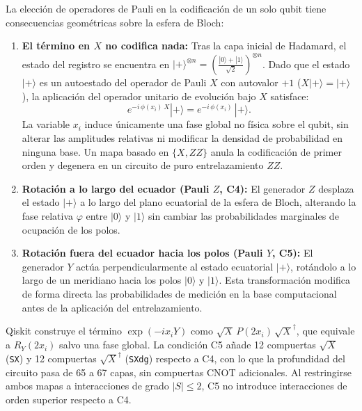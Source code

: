La elección de operadores de Pauli en la codificación de un solo qubit tiene consecuencias
geométricas sobre la esfera de Bloch:
\begin{enumerate}
  \item \textbf{El término en $X$ no codifica nada:} Tras la capa inicial de Hadamard,
        el estado del registro se encuentra en $|+\rangle^{\otimes n} = \left(\frac{|0\rangle + |1\rangle}{\sqrt{2}}\right)^{\otimes n}$.
        Dado que el estado $|+\rangle$ es un autoestado del operador de Pauli $X$ con
        autovalor $+1$ ($X|+\rangle = |+\rangle$), la aplicación del operador unitario de
        evolución bajo $X$ satisface:
        \begin{equation}
          e^{-i\,\phi(x_i)\,X}|+\rangle = e^{-i\,\phi(x_i)}\,|+\rangle.
          \label{eq:x_eigenstate_phase}
        \end{equation}
        La variable $x_i$ induce únicamente una fase global no física sobre el qubit, sin
        alterar las amplitudes relativas ni modificar la densidad de probabilidad en
        ninguna base. Un mapa basado en $\{X, ZZ\}$ anula la codificación
        de primer orden y degenera en un circuito de puro entrelazamiento $ZZ$.
  \item \textbf{Rotación a lo largo del ecuador (Pauli $Z$, C4):} El generador $Z$ desplaza
        el estado $|+\rangle$ a lo largo del plano ecuatorial de la esfera de Bloch, alterando
        la fase relativa $\varphi$ entre $|0\rangle$ y $|1\rangle$ sin cambiar las
        probabilidades marginales de ocupación de los polos.
  \item \textbf{Rotación fuera del ecuador hacia los polos (Pauli $Y$, C5):} El generador
        $Y$ actúa perpendicularmente al estado ecuatorial $|+\rangle$, rotándolo a lo largo
        de un meridiano hacia los polos $|0\rangle$ y $|1\rangle$. Esta transformación
        modifica de forma directa las probabilidades de medición en la base computacional
        antes de la aplicación del entrelazamiento.
\end{enumerate}

Qiskit construye el término $\exp(-i x_i Y)$ como $\sqrt{X}\,P(2x_i)\,\sqrt{X}^\dagger$, que equivale a $R_Y(2x_i)$ salvo una fase global. La condición C5 añade 12 compuertas
$\sqrt{X}$ (\texttt{SX}) y 12 compuertas $\sqrt{X}^\dagger$ (\texttt{SXdg}) respecto a C4,
con lo que la profundidad del circuito pasa de 65 a 67 capas, sin compuertas CNOT
adicionales. Al restringirse ambos mapas a interacciones de grado $|S| \le 2$, C5
no introduce interacciones de orden superior respecto a C4.
